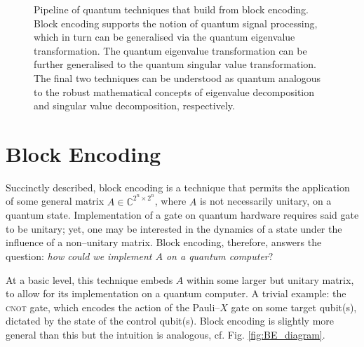 \documentclass{article}
\begin{document}
\begin{figure}[h!]
    \caption{Pipeline of quantum techniques that build from block encoding. Block encoding supports the notion of quantum signal processing, which in turn can be generalised via the quantum eigenvalue transformation. The quantum eigenvalue transformation can be further generalised to the quantum singular value transformation. The final two techniques can be understood as quantum analogous to the robust mathematical concepts of eigenvalue decomposition and singular value decomposition, respectively.}
    \label{fig:pipeline}
\end{figure}

\clearpage
\section{Block Encoding}
Succinctly described, block encoding is a technique that permits the application of some general matrix $A\in\mathbb{C}^{2^n\times 2^n}$, where $A$ is not necessarily unitary, on a quantum state. Implementation of a gate on quantum hardware requires said gate to be unitary; yet, one may be interested in the dynamics of a state under the influence of a non--unitary matrix. Block encoding, therefore, answers the question: \emph{how could we implement $A$ on a quantum computer}?

At a basic level, this technique embeds $A$ within some larger but unitary matrix, to allow for its implementation on a quantum computer. A trivial example: the \textsc{cnot} gate, which encodes the action of the Pauli--$X$ gate on some target qubit(s), dictated by the state of the control qubit(s). Block encoding is slightly more general than this but the intuition is analogous, cf. Fig. \ref{fig:BE_diagram}.
\end{document}
